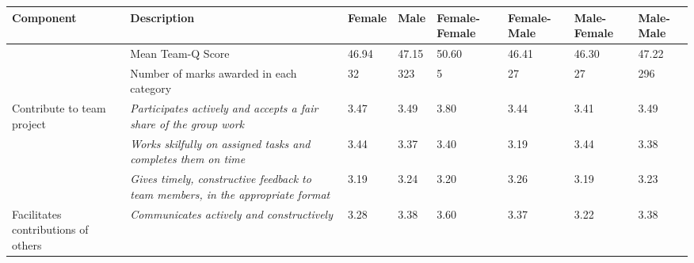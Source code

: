 \documentclass[sigconf, anonymous=false]{acmart}
\begin{document}
\begin{table*}[ht]
\begin{tabular} {| p{1.8cm} | p{7.3cm} | p{1cm}| p{1cm} | p{1cm}| p{1cm} |p{1cm} |p{1cm} |}
		Component&Description&Female&Male&Female-Female&Female-Male&Male-Female&Male-Male\\
		\hline
		& Mean Team-Q Score                                                                                                              & 
		46.94 &
		47.15 &
		50.60                                                    & 46.41                                                & 46.30                                                & 47.22                                              \\
		\hline
		& Number of marks awarded in each category                                                                                                              & 32 & 323 & 5                                                       & 27                                                    & 27                                                    & 296
		\\
		\hline
		Contribute to team project          & {\emph{Participates actively and accepts a fair share of the group work}}                                 &
		3.47 &
		3.49 &
		3.80                                                     & 3.44                                                 & 3.41                                                 & 3.49                                               \\
		\hline
		& {\emph{Works skilfully on assigned tasks and completes them on time}}                                     &
		3.44 &
		3.37 &		 
		3.40                                                     & 3.19                                                 & 3.44                                                 & 3.38                                               \\
		\hline
		& {\emph{Gives timely, constructive feedback to team members, in the appropriate format}}                   &
		3.19 &
		3.24 &
		3.20                                                     & 3.26                                                 & 3.19                                                 & 3.23                                               \\
		\hline
		Facilitates contributions of others & {\emph{Communicates actively and constructively}}                                                         &
		3.28 &
		3.38 &
		3.60                                                     & 3.37                                                 & 3.22                                                 & 3.38                                               \\

\end{tabular}
\end{table*}
\end{document}
